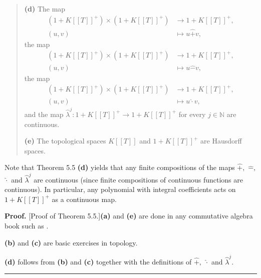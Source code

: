 \documentclass[numbers=enddot,12pt,final,onecolumn,notitlepage]{scrartcl}%
\newenvironment{proof}[1][Proof]{\noindent\textbf{#1.} }{\ \rule{0.5em}{0.5em}}
\begin{document}
\begin{quote}
\textbf{(d)} The map%
\begin{align*}
\left(  1+K\left[  \left[  T\right]  \right]  ^{+}\right)  \times\left(
1+K\left[  \left[  T\right]  \right]  ^{+}\right)   &  \rightarrow1+K\left[
\left[  T\right]  \right]  ^{+},\\
\left(  u,v\right)   &  \mapsto u\widehat{+}v,
\end{align*}
the map%
\begin{align*}
\left(  1+K\left[  \left[  T\right]  \right]  ^{+}\right)  \times\left(
1+K\left[  \left[  T\right]  \right]  ^{+}\right)   &  \rightarrow1+K\left[
\left[  T\right]  \right]  ^{+},\\
\left(  u,v\right)   &  \mapsto u\widehat{-}v,
\end{align*}
the map%
\begin{align*}
\left(  1+K\left[  \left[  T\right]  \right]  ^{+}\right)  \times\left(
1+K\left[  \left[  T\right]  \right]  ^{+}\right)   &  \rightarrow1+K\left[
\left[  T\right]  \right]  ^{+},\\
\left(  u,v\right)   &  \mapsto u\widehat{\cdot}v,
\end{align*}
and the map $\widehat{\lambda}^{j}:1+K\left[  \left[  T\right]  \right]
^{+}\rightarrow1+K\left[  \left[  T\right]  \right]  ^{+}$ for every
$j\in\mathbb{N}$ are continuous.

\textbf{(e)} The topological spaces $K\left[  \left[  T\right]  \right]  $ and
$1+K\left[  \left[  T\right]  \right]  ^{+}$ are Hausdorff spaces.
\end{quote}

Note that Theorem 5.5 \textbf{(d)} yields that any finite compositions of the
maps $\widehat{+},$ $\widehat{-},$ $\widehat{\cdot}$ and $\widehat{\lambda
}^{j}$ are continuous (since finite compositions of continuous functions are
continuous). In particular, any polynomial with integral coefficients acts on
$1+K\left[  \left[  T\right]  \right]  ^{+}$ as a continuous map.

\begin{proof}
[Proof of Theorem 5.5.]\textbf{(a)} and \textbf{(e)} are done in any
commutative algebra book such as \cite[Chapter 10]{AtiMac69}.

\textbf{(b)} and \textbf{(c)} are basic exercises in topology.

\textbf{(d)} follows from \textbf{(b)} and \textbf{(c)} together with the
definitions of $\widehat{+},$ $\widehat{\cdot}$ and $\widehat{\lambda}^{j}$.
\end{proof}
\end{document}

